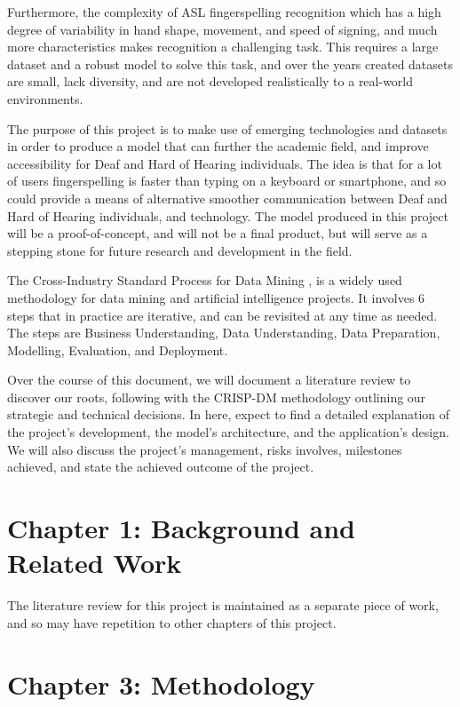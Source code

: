 \documentclass[preprint,11pt,review,authoryear]{elsarticle}
\begin{document}
Furthermore, the complexity of ASL fingerspelling recognition which has a high degree of variability in hand shape, movement, and speed of signing, and much more characteristics makes recognition a challenging task. This requires a large dataset and a robust model to solve this task, and over the years created datasets are small, lack diversity, and are not developed realistically to a real-world environments.

The purpose of this project is to make use of emerging technologies and datasets in order to produce a model that can further the academic field, and improve accessibility for Deaf and Hard of Hearing individuals. The idea is that for a lot of users fingerspelling is faster than typing on a keyboard or smartphone, and so could provide a means of alternative smoother communication between Deaf and Hard of Hearing individuals, and technology. The model produced in this project will be a proof-of-concept, and will not be a final product, but will serve as a stepping stone for future research and development in the field. 

The Cross-Industry Standard Process for Data Mining \citep{hotzWhatCRISPDM2018}, is a widely used methodology for data mining and artificial intelligence projects. It involves 6 steps that in practice are iterative, and can be revisited at any time as needed. The steps are Business Understanding, Data Understanding, Data Preparation, Modelling, Evaluation, and Deployment.

Over the course of this document, we will document a literature review to discover our roots, following with the CRISP-DM methodology outlining our strategic and technical decisions. In here, expect to find a detailed explanation of the project's development, the model's architecture, and the application's design. We will also discuss the project's management, risks involves, milestones achieved, and state the achieved outcome of the project.


\section{Chapter 1: Background and Related Work}

The literature review for this project is maintained as a separate piece of work, and so may have repetition to other chapters of this project.

\section{Chapter 3: Methodology}
\end{document}
